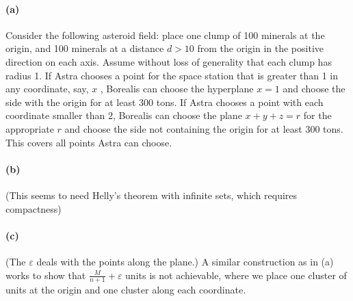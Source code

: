\documentclass[11pt,letterpaper]{article}
\theoremstyle{definition}
\begin{document}
\paragraph{(a)}
Consider the following asteroid field: place one clump of 100 minerals at the origin, and 100 minerals at a distance $d>10$ from the origin in the positive direction on each axis.
Assume without loss of generality that each clump has radius 1.
If Astra chooses a point for the space station that is greater than 1 in any coordinate, say, $x$ , Borealis can choose the hyperplane $x=1$ and choose the side with the origin for at least 300 tons.
If Astra chooses a point with each coordinate smaller than $2$, Borealis can choose the plane $x+y+z= r$ for the appropriate $r$ and choose the side not containing the origin for at least 300 tons.
This covers all points Astra can choose.

\paragraph{(b)}
(This seems to need Helly's theorem with infinite sets, which requires compactness)



\paragraph{(c)}

(The $\varepsilon$ deals with the points along the plane.)
A similar construction as in (a) works to show that $\frac{M}{n+1} + \varepsilon$ units is not achievable, where we place one cluster of units at the origin and one cluster along each coordinate.
\end{document}
